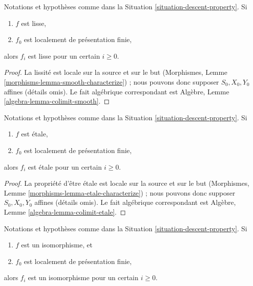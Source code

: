 \begin{lemma}
\label{lemma-descend-smooth}
Notations et hypothèses comme dans la
Situation \ref{situation-descent-property}. Si
\begin{enumerate}
\item $f$ est lisse,
\item $f_0$ est localement de présentation finie,
\end{enumerate}
alors $f_i$ est lisse pour un certain $i \geq 0$.
\end{lemma}

\begin{proof}
La lissité est locale sur la source et sur le but (Morphismes,
Lemme \ref{morphisms-lemma-smooth-characterize}) ; nous pouvons donc supposer
$S_0, X_0, Y_0$ affines (détails omis). Le fait algébrique correspondant
est Algèbre, Lemme \ref{algebra-lemma-colimit-smooth}.
\end{proof}

\begin{lemma}
\label{lemma-descend-etale}
Notations et hypothèses comme dans la
Situation \ref{situation-descent-property}. Si
\begin{enumerate}
\item $f$ est \'etale,
\item $f_0$ est localement de présentation finie,
\end{enumerate}
alors $f_i$ est \'etale pour un certain $i \geq 0$.
\end{lemma}

\begin{proof}
La propriété d'être \'etale est locale sur la source et sur le but (Morphismes,
Lemme \ref{morphisms-lemma-etale-characterize}) ; nous pouvons donc supposer
$S_0, X_0, Y_0$ affines (détails omis). Le fait algébrique correspondant
est Algèbre, Lemme \ref{algebra-lemma-colimit-etale}.
\end{proof}

\begin{lemma}
\label{lemma-descend-isomorphism}
Notations et hypothèses comme dans la
Situation \ref{situation-descent-property}. Si
\begin{enumerate}
\item $f$ est un isomorphisme, et
\item $f_0$ est localement de présentation finie,
\end{enumerate}
alors $f_i$ est un isomorphisme pour un certain $i \geq 0$.
\end{lemma}

